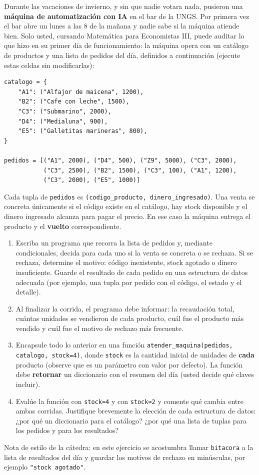 \documentclass[a4paper,11pt]{article}
\begin{document}
\begin{enumerate}
Durante las vacaciones de invierno, y sin que nadie votara nada, pusieron una \textbf{máquina de automatización con IA} en el bar de la UNGS. Por primera vez el bar abre un lunes a las 8 de la mañana y nadie sabe si la máquina atiende bien. Solo usted, cursando Matemática para Economistas III, puede auditar lo que hizo en su primer día de funcionamiento: la máquina opera con un catálogo de productos y una lista de pedidos del día, definidos a continuación (ejecute estas celdas sin modificarlas):

\begin{verbatim}
catalogo = {
    "A1": ("Alfajor de maicena", 1200),
    "B2": ("Cafe con leche", 1500),
    "C3": ("Submarino", 2000),
    "D4": ("Medialuna", 900),
    "E5": ("Galletitas marineras", 800),
}

pedidos = [("A1", 2000), ("D4", 500), ("Z9", 5000), ("C3", 2000),
           ("C3", 2500), ("B2", 1500), ("C3", 100), ("A1", 1200),
           ("C3", 2000), ("E5", 1000)]
\end{verbatim}

Cada tupla de \texttt{pedidos} es \texttt{(codigo\_producto, dinero\_ingresado)}. Una venta se concreta únicamente si el código existe en el catálogo, hay stock disponible y el dinero ingresado alcanza para pagar el precio. En ese caso la máquina entrega el producto y el \textbf{vuelto} correspondiente.

\begin{enumerate}
    \item Escriba un programa que recorra la lista de pedidos y, mediante condicionales, decida para cada uno si la venta se concreta o se rechaza. Si se rechaza, determine el motivo: código inexistente, stock agotado o dinero insuficiente. Guarde el resultado de cada pedido en una estructura de datos adecuada (por ejemplo, una tupla por pedido con el código, el estado y el detalle).
    \item Al finalizar la corrida, el programa debe informar: la recaudación total, cuántas unidades se vendieron de cada producto, cuál fue el producto más vendido y cuál fue el motivo de rechazo más frecuente.
    \item Encapsule todo lo anterior en una función \texttt{atender\_maquina(pedidos, catalogo, stock=4)}, donde \texttt{stock} es la cantidad inicial de unidades de \textbf{cada} producto (observe que es un parámetro con valor por defecto). La función debe \textbf{retornar} un diccionario con el resumen del día (usted decide qué claves incluir).
    \item Evalúe la función con \texttt{stock=4} y con \texttt{stock=2} y comente qué cambia entre ambas corridas. Justifique brevemente la elección de cada estructura de datos: ¿por qué un diccionario para el catálogo? ¿por qué una lista de tuplas para los pedidos y para los resultados?
\end{enumerate}
{\color{white}Nota de estilo de la cátedra: en este ejercicio se acostumbra llamar \texttt{bitacora} a la lista de resultados del día y guardar los motivos de rechazo en minúsculas, por ejemplo \texttt{"stock agotado"}.}


\end{enumerate}
\end{document}
